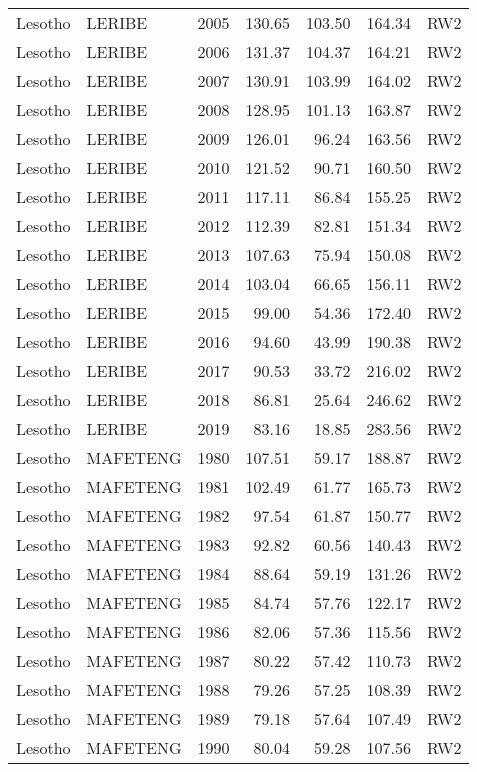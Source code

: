 \begin{longtable}{lllrrrl}
  Lesotho & LERIBE & 2005 & 130.65 & 103.50 & 164.34 & RW2 \\ 
  Lesotho & LERIBE & 2006 & 131.37 & 104.37 & 164.21 & RW2 \\ 
  Lesotho & LERIBE & 2007 & 130.91 & 103.99 & 164.02 & RW2 \\ 
  Lesotho & LERIBE & 2008 & 128.95 & 101.13 & 163.87 & RW2 \\ 
  Lesotho & LERIBE & 2009 & 126.01 & 96.24 & 163.56 & RW2 \\ 
  Lesotho & LERIBE & 2010 & 121.52 & 90.71 & 160.50 & RW2 \\ 
  Lesotho & LERIBE & 2011 & 117.11 & 86.84 & 155.25 & RW2 \\ 
  Lesotho & LERIBE & 2012 & 112.39 & 82.81 & 151.34 & RW2 \\ 
  Lesotho & LERIBE & 2013 & 107.63 & 75.94 & 150.08 & RW2 \\ 
  Lesotho & LERIBE & 2014 & 103.04 & 66.65 & 156.11 & RW2 \\ 
  Lesotho & LERIBE & 2015 & 99.00 & 54.36 & 172.40 & RW2 \\ 
  Lesotho & LERIBE & 2016 & 94.60 & 43.99 & 190.38 & RW2 \\ 
  Lesotho & LERIBE & 2017 & 90.53 & 33.72 & 216.02 & RW2 \\ 
  Lesotho & LERIBE & 2018 & 86.81 & 25.64 & 246.62 & RW2 \\ 
  Lesotho & LERIBE & 2019 & 83.16 & 18.85 & 283.56 & RW2 \\ 
  Lesotho & MAFETENG & 1980 & 107.51 & 59.17 & 188.87 & RW2 \\ 
  Lesotho & MAFETENG & 1981 & 102.49 & 61.77 & 165.73 & RW2 \\ 
  Lesotho & MAFETENG & 1982 & 97.54 & 61.87 & 150.77 & RW2 \\ 
  Lesotho & MAFETENG & 1983 & 92.82 & 60.56 & 140.43 & RW2 \\ 
  Lesotho & MAFETENG & 1984 & 88.64 & 59.19 & 131.26 & RW2 \\ 
  Lesotho & MAFETENG & 1985 & 84.74 & 57.76 & 122.17 & RW2 \\ 
  Lesotho & MAFETENG & 1986 & 82.06 & 57.36 & 115.56 & RW2 \\ 
  Lesotho & MAFETENG & 1987 & 80.22 & 57.42 & 110.73 & RW2 \\ 
  Lesotho & MAFETENG & 1988 & 79.26 & 57.25 & 108.39 & RW2 \\ 
  Lesotho & MAFETENG & 1989 & 79.18 & 57.64 & 107.49 & RW2 \\ 
  Lesotho & MAFETENG & 1990 & 80.04 & 59.28 & 107.56 & RW2 \\ 

\end{longtable}

